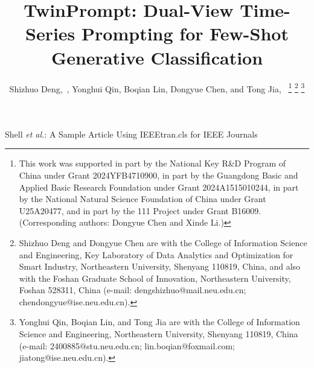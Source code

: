 \documentclass[lettersize,journal]{IEEEtran}
\begin{document}
\title{TwinPrompt: Dual-View Time-Series Prompting for Few-Shot Generative Classification}

\author{Shizhuo Deng,~,
        Yonghui Qin,
        Boqian Lin,
        Dongyue Chen,
        and Tong Jia,~
\thanks{This work was supported in part by the National Key R\&D Program of China under Grant 2024YFB4710900, in part by the Guangdong Basic and Applied Basic Research Foundation under Grant 2024A1515010244, in part by the National Natural Science Foundation of China under Grant U25A20477, and in part by the 111 Project under Grant B16009. (Corresponding authors: Dongyue Chen and Xinde Li.)}%
\thanks{Shizhuo Deng and Dongyue Chen are with the College of Information Science and Engineering, Key Laboratory of Data Analytics and Optimization for Smart Industry, Northeastern University, Shenyang 110819, China, and also with the Foshan Graduate School of Innovation, Northeastern University, Foshan 528311, China (e-mail: dengshizhuo@mail.neu.edu.cn; chendongyue@ise.neu.edu.cn).}%
\thanks{Yonghui Qin, Boqian Lin, and Tong Jia are with the College of Information Science and Engineering, Northeastern University, Shenyang 110819, China (e-mail: 2400885@stu.neu.edu.cn; lin.boqian@foxmail.com; jiatong@ise.neu.edu.cn).}}%

%
{Shell \MakeLowercase{\textit{et al.}}: A Sample Article Using IEEEtran.cls for IEEE Journals}


\maketitle
\end{document}
